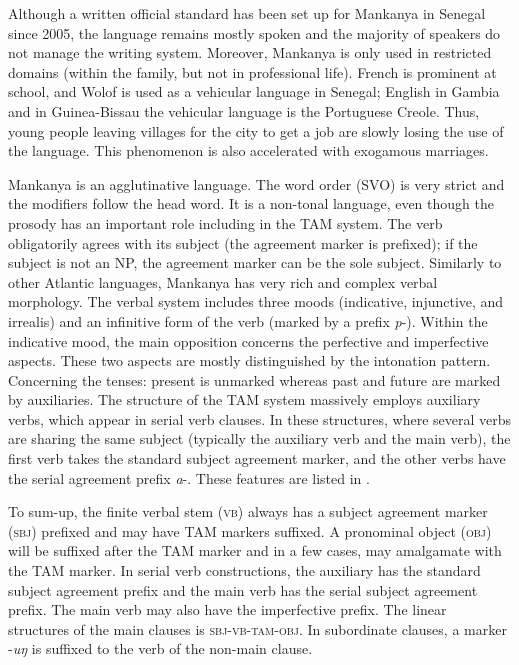 \documentclass[output=paper,colorlinks,citecolor=brown]{langscibook}
\begin{document}

Although a written official standard has been set up for Mankanya in Senegal since 2005, the language remains mostly spoken and the majority of speakers do not manage the writing system. Moreover, Mankanya is only used in restricted domains (within the family, but not in professional life). French is prominent at school, and Wolof is used as a vehicular language in Senegal; English in Gambia and in Guinea-Bissau the vehicular language is the Portuguese Creole. Thus, young people leaving villages for the city to get a job are slowly losing the use of the language. This phenomenon is also accelerated with exogamous marriages. 

Mankanya is an agglutinative language. The word order (SVO) is very strict and the modifiers follow the head word. It is a non-tonal language, even though the prosody has an important role including in the TAM system. The verb obligatorily agrees with its subject (the agreement marker is prefixed); if the subject is not an NP, the agreement marker can be the sole subject. Similarly to other Atlantic languages, Mankanya has very rich and complex verbal morphology. The verbal system includes three moods (indicative, injunctive, and irrealis) and an infinitive form of the verb (marked by a prefix \textit{p}{}-). Within the indicative mood, the main opposition concerns the perfective and imperfective aspects. These two aspects are mostly distinguished by the intonation pattern. Concerning the tenses: present is unmarked whereas past and future are marked by auxiliaries. The structure of the TAM system massively employs auxiliary verbs, which appear in serial verb clauses. In these structures, where several verbs are sharing the same subject (typically the auxiliary verb and the main verb), the first verb takes the standard subject agreement marker, and the other verbs have the serial agreement prefix \textit{a}{}-. These features are listed in .

To sum-up, the finite verbal stem (\textsc{vb}) always has a subject agreement marker (\textsc{sbj}) prefixed and may have TAM markers suffixed. A pronominal object (\textsc{obj}) will be suffixed after the TAM marker and in a few cases, may amalgamate with the TAM marker. In serial verb constructions, the auxiliary has the standard subject agreement prefix and the main verb has the serial subject agreement prefix. The main verb may also have the imperfective prefix. The linear structures of the main clauses is \textsc{sbj-vb-tam-obj}. 
In subordinate clauses, a marker -\textit{uŋ} is suffixed to the verb of the non-main clause. 
\end{document}
